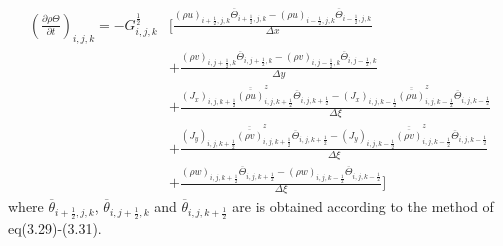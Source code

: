 \begin{align}
 \left(\frac{\partial \rho \Theta}{\partial t}\right)_{i,j,k}
 = - G^{\frac{1}{2}}_{i,j,k} &\Bigg[ \frac{ (\rho u)_{i+\frac{1}{2},j,k} \overline{\Theta}_{i+\frac{1}{2},j,k}
                                          - (\rho u)_{i-\frac{1}{2},j,k} \overline{\Theta}_{i-\frac{1}{2},j,k}
                                          } {\Delta x} \nonumber \\
                                  &+ \frac{ (\rho v)_{i,j+\frac{1}{2},k} \overline{\Theta}_{i,j+\frac{1}{2},k}
                                          - (\rho v)_{i,j-\frac{1}{2},k} \overline{\Theta}_{i,j-\frac{1}{2},k}
                                          } {\Delta y} \nonumber \\
                                  &+ \frac{ (J_{x})_{i,j,k+\frac{1}{2}} \overline{\overline{(\rho u)}}^z_{i,j,k+\frac{1}{2}} \overline{\Theta}_{i,j,k+\frac{1}{2}}
                                          - (J_{x})_{i,j,k-\frac{1}{2}} \overline{\overline{(\rho u)}}^z_{i,j,k-\frac{1}{2}} \overline{\Theta}_{i,j,k-\frac{1}{2}}
                                          } {\Delta \xi} \nonumber \\
                                  &+ \frac{ (J_{y})_{i,j,k+\frac{1}{2}} \overline{\overline{(\rho v)}}^z_{i,j,k+\frac{1}{2}} \overline{\Theta}_{i,j,k+\frac{1}{2}}
                                          - (J_{y})_{i,j,k-\frac{1}{2}} \overline{\overline{(\rho v)}}^z_{i,j,k-\frac{1}{2}} \overline{\Theta}_{i,j,k-\frac{1}{2}}
                                          } {\Delta \xi} \nonumber \\
                                  &+ \frac{ (\rho w)_{i,j,k+\frac{1}{2}} \overline{\Theta}_{i,j,k+\frac{1}{2}}
                                          - (\rho w)_{i,j,k-\frac{1}{2}} \overline{\Theta}_{i,j,k-\frac{1}{2}}
                                          } {\Delta \xi} \Bigg]
\end{align}
where $\overline{\theta}_{i+\frac{1}{2},j,k}$, $\overline{\theta}_{i,j+\frac{1}{2},k}$ and 
$\overline{\theta}_{i,j,k+\frac{1}{2}}$ are is obtained according to the method of eq(3.29)-(3.31).

